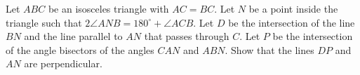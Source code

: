 Let $ABC$ be an isosceles triangle with $AC=BC$. Let $N$ be a point inside the triangle such that $2 \angle ANB = 180 ^\circ + \angle ACB $. Let $ D $ be the intersection of the line $BN$ and the line parallel to $AN$ that passes through $C$. Let $P$ be the intersection of the angle bisectors of the angles $CAN$ and $ABN$. Show that the lines $DP$ and $AN$ are perpendicular.